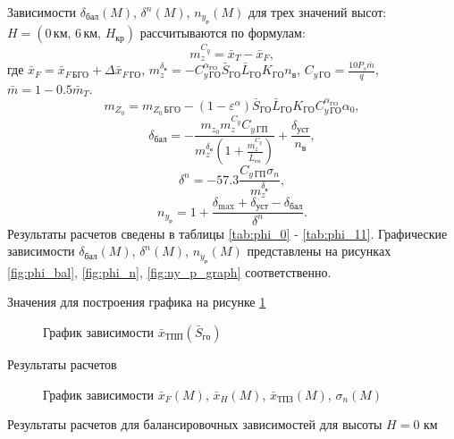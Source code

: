 Зависимости $\delta_{бал}(M)$, $\delta^n(M)$, $n_{y_р}(M)$ для трех значений
высот: $H=(0 \, км,\, 6 \, км,\, H_{кр})$ рассчитываются по формулам:
\[
    m_z^{C_y} = \bar{x}_T - \bar{x}_F,
\]
где $\bar{x}_{F} = \bar{x}_{F\, БГО} + \Delta \bar{x}_{F\, ГО}$, $m_z^{\delta_в} = 
-C_{y\, {ГО}}^{\alpha_{ГО}} \bar{S}_{ГО} \bar{L}_{ГО} K_{ГО} n_в$, $C_{y\, {ГО}}
= \frac{10 P_s \bar{m}}{q}$, $\bar{m} = 1 - 0.5 \bar{m}_{T}$.
\[
    m_{Z_0} = m_{Z_0\, БГО} - 
    (1-\varepsilon^\alpha)\bar{S}_{ГО} \bar{L}_{ГО} K_{ГО} C_{y\,{ГО}}^{\alpha_{ГО}}
    \alpha_0,
\]
\[
    \delta_{бал}  = - \frac{m_{z_0} m_z^{C_y} C_{y\, {ГП}}}{ m_z^{\delta_в}
    \left(1 + \frac{m_z^{C_y}}{\bar{L}_{го}}\right)} + \frac{\delta_{уст}}{n_в},
\]
\[
    \delta^n = -57.3 \frac{C_{y\, ГП} \sigma_n}{ m_z^{\delta_в}},
\]
\[
    n_{y_р} = 1 + \frac{\delta_{\max} + \delta_{уст} - \delta_{бал}}{\delta^n}.
\]
Результаты расчетов сведены в таблицы \ref{tab:phi_0} - \ref{tab:phi_11}.
Графические зависимости $\delta_{бал}(M)$, $\delta^n(M)$, $n_{y_{р}}(M)$
представлены на рисунках \ref{fig:phi_bal}, \ref{fig:phi_n},
\ref{fig:ny_p_graph} соответственно.

\begin{table}[H]
    \centering
    \caption{Значения для построения графика на рисунке \ref{fig:xTP}}
    \label{tab:otn_S_go}
    
\end{table}
\begin{figure}[H]
\centering
\resizebox{.79\linewidth}{!}{}
\caption{График зависимости $\bar{x}_{ТПП}(\bar{S}_{го})$} 
\label{fig:xTP}
\end{figure}

\begin{table}[H]
    \centering
    \caption{Результаты расчетов}
    \label{tab:sigmas}
    
\end{table}

\begin{figure}[H]
\centering
\resizebox{.79\linewidth}{!}{}
\caption{График зависимости $\bar{x}_{F}(M)$, $\bar{x}_{H}(M)$, $\bar{x}_{ТПЗ}(M)$, $\sigma_{n}(M)$}
\label{fig:xis_sigma}
\end{figure}


\begin{table}[H]
    \centering
    \caption{Результаты расчетов для балансировочных зависимостей для высоты
    $H=0$ км}
    \label{tab:phi_0}
    
\end{table}

